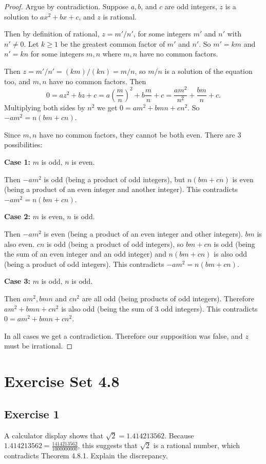 \documentclass[14pt]{extarticle}
\begin{document}
\begin{proof}
    Argue by contradiction. Suppose $a, b$, and $c$ are odd integers, $z$ is a solution to $ax^2 + bx + c$, and $z$ is rational.

    Then by definition of rational, $z = m'/n'$, for some integers $m'$ and $n'$ with $n' \neq 0$. Let $k \geq 1$ be the greatest common factor of $m'$ and $n'$. So $m'=km$ and $n'=kn$ for some integers $m,n$ where $m,n$ have no common factors.

    Then $z = m'/n' = (km)/(kn) = m/n$, so $m/n$ is a solution of the equation too, and $m,n$ have no common factors. Then
    \[
        0 = az^2+bz+c = a\left(\frac{m}{n}\right)^2 + b\frac{m}{n} + c = \frac{am^2}{n^2} + \frac{bm}{n} + c.
    \]
    Multiplying both sides by $n^2$ we get $0 = am^2 + bmn + cn^2$. So $-am^2 = n(bm+cn)$.

    Since $m,n$ have no common factors, they cannot be both even. There are 3 possibilities:

    {\bf Case 1:} $m$ is odd, $n$ is even.

    Then $-am^2$ is odd (being a product of odd integers), but $n(bm + cn)$ is even (being a product of an even integer and another integer). This contradicts $-am^2 = n(bm+cn)$.

        {\bf Case 2:} $m$ is even, $n$ is odd.

    Then $-am^2$ is even (being a product of an even integer and other integers). $bm$ is also even. $cn$ is odd (being a product of odd integers), so $bm+cn$ is odd (being the sum of an even integer and an odd integer) and $n(bm+cn)$ is also odd (being a product of odd integers). This contradicts $-am^2 = n(bm+cn)$.

        {\bf Case 3:} $m$ is odd, $n$ is odd.

    Then $am^2, bmn$ and $cn^2$ are all odd (being products of odd integers). Therefore  $am^2 + bmn + cn^2$ is also odd (being the sum of 3 odd integers). This contradicts $0 = am^2 + bmn + cn^2$.

    In all cases we get a contradiction. Therefore our supposition was false, and $z$ must be irrational.
\end{proof}

\section{Exercise Set 4.8}

\subsection{Exercise 1}
A calculator display shows that $\sqrt{2} = 1.414213562$.
Because $1.414213562 = \frac{1414213562}{1000000000}$, this suggests that $\sqrt{2}$ is a rational number, which contradicts Theorem 4.8.1. Explain the discrepancy.
\end{document}
